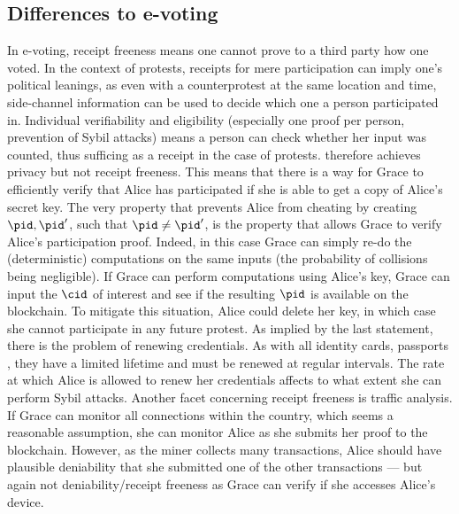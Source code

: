  
\subsection{Differences to e-voting}

In e-voting, receipt freeness means one cannot prove to a third party
how one voted. In the context of protests, receipts for mere
participation can imply one's political leanings, as even with a
counterprotest at the same location and time, side-channel information
can be used to decide which one a person participated in. Individual
verifiability and eligibility (especially one proof per person,
prevention of Sybil attacks) means a person can check whether her
input was counted, thus sufficing as a receipt in the case of
protests.  \PRIVO therefore achieves privacy but not receipt freeness.
This means that there is a way for Grace to efficiently verify that
Alice has participated if she is able to get a copy of Alice's secret
key. The very property that prevents Alice from cheating by creating
\(\pid, \pid'\), such that \(\pid \neq \pid'\), is the property that
allows Grace to verify Alice's participation proof.  Indeed, in this
case Grace can simply re-do the (deterministic) computations on the
same inputs (the probability of collisions being negligible).  If
Grace can perform computations using Alice's key, Grace can input the
\(\cid\) of interest and see if the resulting \(\pid\) is available on
the blockchain.  To mitigate this situation, Alice could delete her
key, in which case she cannot participate in any future protest.  As
implied by the last statement, there is the problem of renewing
credentials.  As with all identity cards, passports \etc, they have a
limited lifetime and must be renewed at regular intervals.  The rate
at which Alice is allowed to renew her credentials affects to what
extent she can perform Sybil attacks. Another facet concerning receipt
freeness is traffic analysis. If Grace can monitor all connections
within the country, which seems a reasonable assumption, she can
monitor Alice as she submits her proof to the blockchain. However, as
the miner collects many transactions, Alice should have plausible
deniability that she submitted one of the other transactions --- but
again not deniability/receipt freeness as Grace can verify if she
accesses Alice's device.

